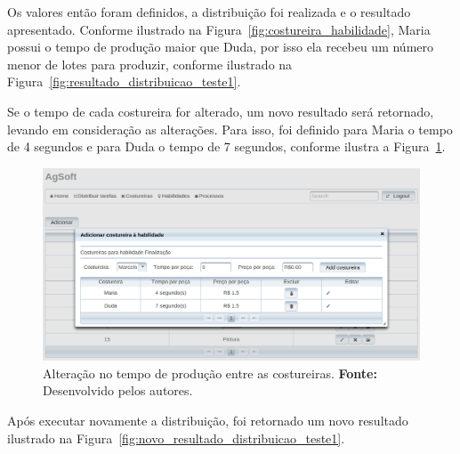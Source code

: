 \par Os valores então foram definidos, a distribuição foi realizada e o resultado apresentado. 
Conforme ilustrado na Figura~\ref{fig:costureira_habilidade}, Maria possui
o tempo de produção maior que Duda, por isso ela recebeu um número menor de lotes
para produzir, conforme ilustrado na
Figura~\ref{fig:resultado_distribuicao_teste1}.

\par Se o tempo de cada costureira for alterado, um novo resultado será
retornado, levando em consideração as alterações. Para isso, foi definido para
Maria o tempo de 4 segundos e para Duda o tempo de 7 segundos, conforme ilustra
a Figura~\ref{fig:tempo_costureiras}. 

\newpage

\begin{figure}[h!]
	\centerline{\includegraphics[width=14cm]{./imagens/alterando_tempo_costureira.png}}
	\caption[Alteração no tempo de produção entre as costureiras.]
	{Alteração no tempo de produção entre as costureiras. \textbf{Fonte:}
	Desenvolvido pelos autores.}
	\label{fig:tempo_costureiras}
\end{figure}

\par Após executar novamente a distribuição, foi retornado um novo resultado
ilustrado na Figura~\ref{fig:novo_resultado_distribuicao_teste1}.



